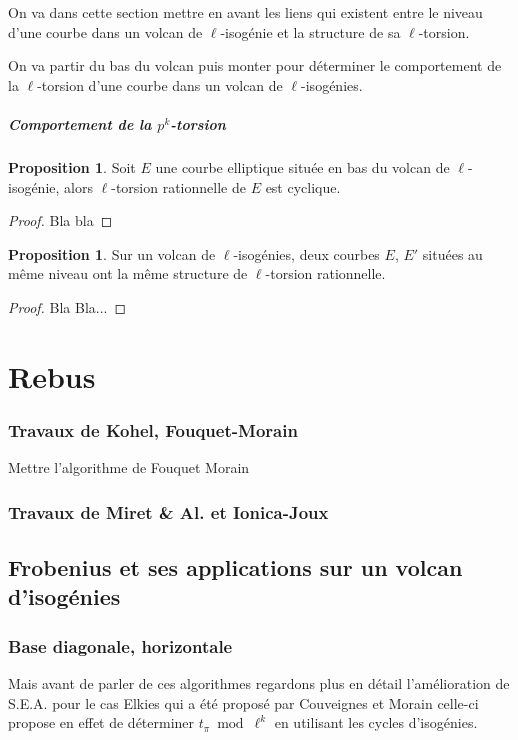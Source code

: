\documentclass[10pt,a4paper]{book}
\theoremstyle{plain}
\theoremstyle{definition}
\theoremstyle{definition}
\theoremstyle{definition}
\newtheorem{prop}[thm]{Proposition}
\theoremstyle{definition}
\theoremstyle{remark}
\theoremstyle{remark}
\begin{document}
On va dans cette section mettre en avant les liens qui existent entre le niveau d'une courbe dans un volcan de $\ell$-isogénie et la structure de sa $\ell$-torsion.

On va partir du bas du volcan puis monter pour déterminer le comportement de la $\ell$-torsion d'une courbe dans un volcan de $\ell$-isogénies. 

\paragraph{Comportement de la $p^k$-torsion}

\begin{prop}
Soit $E$ une courbe elliptique située en bas du volcan de $\ell$-isogénie, alors $\ell$-torsion rationnelle de $E$ est cyclique.
\end{prop}

\begin{proof}
Bla bla
\end{proof}

\begin{prop}
Sur un volcan de $\ell$-isogénies, deux courbes $E$, $E'$ situées au même niveau ont la même structure de $\ell$-torsion rationnelle.
\end{prop}

\begin{proof}
Bla Bla...
\end{proof}

\chapter{Rebus}

\subsection{Travaux de Kohel, Fouquet-Morain}
Mettre l'algorithme de Fouquet Morain
\subsection{Travaux de Miret \& Al. et Ionica-Joux}


\section{Frobenius et ses applications sur un volcan d'isogénies}
\subsection{Base diagonale, horizontale}
Mais avant de parler de ces algorithmes regardons plus en détail l'amélioration de S.E.A. pour le cas Elkies qui a été proposé par Couveignes et Morain \cite{Couveignes96isogenycycles} celle-ci propose en effet de déterminer $t_{\pi} \bmod \ell^k$ en utilisant les cycles d'isogénies. 
\end{document}
